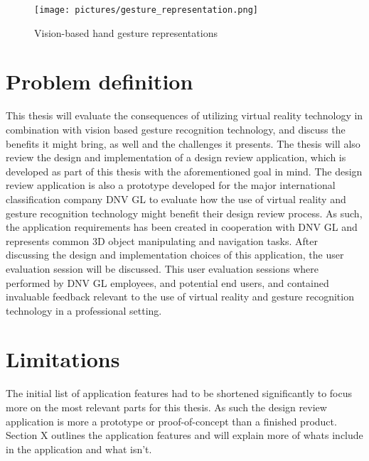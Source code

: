 \begin{figure}%
	\texttt{[image: pictures/gesture\_representation.png]}
	\caption[Vision-based hand gesture representations]{Vision-based hand gesture representations~\citep{Bourke2007} }
	\label{fig:oculus}
\end{figure}


\section{Problem definition}


This thesis will evaluate the consequences of utilizing virtual reality technology in combination with vision based gesture recognition technology, and discuss the benefits it 
might bring, as well and the challenges it presents. 
The thesis will also review the design and implementation of a design review application, which is developed as part of this thesis with the aforementioned goal in mind. 
The design review application is also a prototype developed for the major international classification company DNV GL to evaluate how the use of virtual reality and gesture
recognition technology might benefit their design review process. As such, the application requirements has been created in cooperation with DNV GL and represents
common 3D object manipulating and navigation tasks. After discussing the design and implementation choices of this application, the user evaluation session will be discussed. 
This user evaluation sessions where performed by DNV GL employees, and potential end users, and contained invaluable feedback relevant to the use of virtual reality and gesture
recognition technology in a professional setting. 

\section{Limitations}
The initial list of application features had to be shortened significantly to focus more on the most relevant parts for this thesis. As such the design review application
is more a prototype or proof-of-concept than a finished product. Section X outlines the application features and will explain more of whats include in the application and what isn't. 

